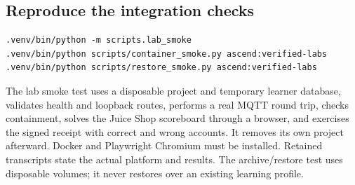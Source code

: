 \subsection{Reproduce the integration checks}
\begin{verbatim}
.venv/bin/python -m scripts.lab_smoke
.venv/bin/python scripts/container_smoke.py ascend:verified-labs
.venv/bin/python scripts/restore_smoke.py ascend:verified-labs
\end{verbatim}
The lab smoke test uses a disposable project and temporary learner database, validates
health and loopback routes, performs a real MQTT round trip, checks containment,
solves the Juice Shop scoreboard through a browser, and exercises the signed receipt
with correct and wrong accounts. It removes its own project afterward. Docker and
Playwright Chromium must be installed. Retained transcripts state the actual platform
and results. The archive/restore test uses disposable volumes; it never restores over
an existing learning profile.

